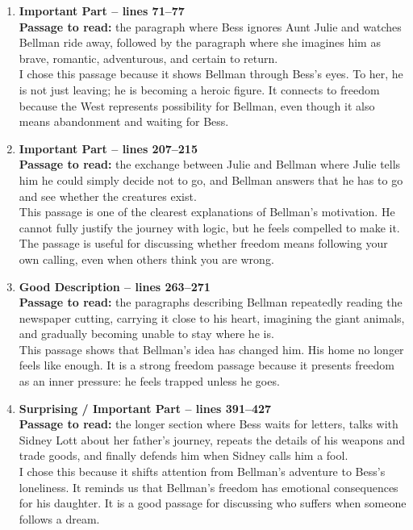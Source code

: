 \documentclass[11pt,a4paper]{article}
\begin{document}
\begin{enumerate}[label=\textbf{\arabic*.}, leftmargin=*]
    \item \textbf{Important Part -- lines 71--77}\\
    \textbf{Passage to read:} the paragraph where Bess ignores Aunt Julie and watches Bellman ride away, followed by the paragraph where she imagines him as brave, romantic, adventurous, and certain to return.\\
    I chose this passage because it shows Bellman through Bess's eyes. To her, he is not just leaving; he is becoming a heroic figure. It connects to freedom because the West represents possibility for Bellman, even though it also means abandonment and waiting for Bess.

    \item \textbf{Important Part -- lines 207--215}\\
    \textbf{Passage to read:} the exchange between Julie and Bellman where Julie tells him he could simply decide not to go, and Bellman answers that he has to go and see whether the creatures exist.\\
    This passage is one of the clearest explanations of Bellman's motivation. He cannot fully justify the journey with logic, but he feels compelled to make it. The passage is useful for discussing whether freedom means following your own calling, even when others think you are wrong.

    \item \textbf{Good Description -- lines 263--271}\\
    \textbf{Passage to read:} the paragraphs describing Bellman repeatedly reading the newspaper cutting, carrying it close to his heart, imagining the giant animals, and gradually becoming unable to stay where he is.\\
    This passage shows that Bellman's idea has changed him. His home no longer feels like enough. It is a strong freedom passage because it presents freedom as an inner pressure: he feels trapped unless he goes.

    \item \textbf{Surprising / Important Part -- lines 391--427}\\
    \textbf{Passage to read:} the longer section where Bess waits for letters, talks with Sidney Lott about her father's journey, repeats the details of his weapons and trade goods, and finally defends him when Sidney calls him a fool.\\
    I chose this because it shifts attention from Bellman's adventure to Bess's loneliness. It reminds us that Bellman's freedom has emotional consequences for his daughter. It is a good passage for discussing who suffers when someone follows a dream.


\end{enumerate}
\end{document}
